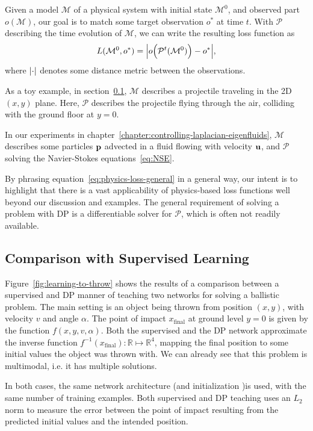 Given a model $\mathcal{M}$ of a physical system with initial state
$\mathcal{M}^0$, and observed part $o(\mathcal{M})$, our goal is to match some
target observation $o^*$ at time $t$.  With $\mathcal{P}$ describing the time
evolution of $\mathcal{M}$, we can write the resulting loss function as 
\begin{equation}\label{eq:physics-loss-general}
  L(\mathcal{M}^0, o^*) = \abs{o\Big(\mathcal{P}^t(\mathcal{M}^0)\Big) - o^*},
\end{equation}
where $\abs{\cdot}$ denotes some distance metric between the observations.

As a toy example, in section~\ref{section:comparison-with-supervised-learning},
$\mathcal{M}$ describes a projectile traveling in the 2D $(x,y)$ plane. Here,
$\mathcal{P}$ describes the projectile flying through the air, colliding with
the ground floor at $y=0$.

In our experiments in chapter~\ref{chapter:controlling-laplacian-eigenfluids},
$\mathcal{M}$ describes some particles $\vb{p}$ advected in a fluid flowing with
velocity $\vb{u}$, and $\mathcal{P}$ solving the Navier-Stokes
equations~\ref{eq:NSE}.

By phrasing equation~\ref{eq:physics-loss-general} in a general way, our intent
is to highlight that there is a vast applicability of physics-based loss
functions well beyond our discussion and examples. The general requirement of
solving a problem with \ac{DP} is a differentiable solver for $\mathcal{P}$,
which is often not readily available.

\subsection{Comparison with Supervised Learning}
\label{section:comparison-with-supervised-learning}
Figure~\ref{fig:learning-to-throw} shows the results of a comparison between
a supervised and \acf{DP} manner of teaching two networks for solving
a ballistic problem. The main setting is an object being thrown from position
$(x,y)$, with velocity $v$ and angle $\alpha$. The point of impact
$x_{\text{final}}$ at ground level $y=0$ is given by the function
$f(x,y,v,\alpha)$. Both the supervised and the \ac{DP} network approximate the
inverse function $f^{-1}(x_{\text{final}}): \mathbb{R} \mapsto \mathbb{R}^4$,
mapping the final position to some initial values the object was thrown with. We
can already see that this problem is multimodal, i.e. it has multiple solutions.

In both cases, the same network architecture (and initialization )is used, with
the same number of training examples. Both supervised and \ac{DP} teaching uses
an $L_2$ norm to measure the error between the point of impact resulting from
the predicted initial values and the intended position.

